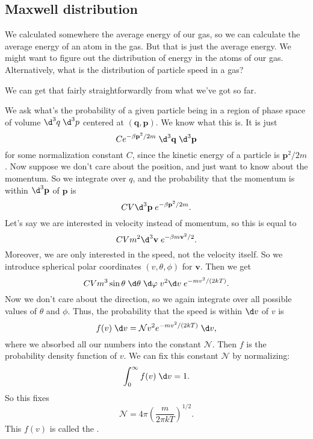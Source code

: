 \documentclass[a4paper]{article}
\begin{document}
\subsection{Maxwell distribution}
We calculated somewhere the average energy of our gas, so we can calculate the average energy of an atom in the gas. But that is just the average energy. We might want to figure out the distribution of energy in the atoms of our gas. Alternatively, what is the distribution of particle speed in a gas?

We can get that fairly straightforwardly from what we've got so far.

We ask what's the probability of a given particle being in a region of phase space of volume $\d^3 q \;\d^3 p$ centered at $(\mathbf{q}, \mathbf{p})$. We know what this is. It is just
\[
  C e^{-\beta \mathbf{p}^2/2m}\;\d^3 \mathbf{q}\;\d^3 \mathbf{p}
\]
for some normalization constant $C$, since the kinetic energy of a particle is $\mathbf{p}^2/2m$. Now suppose we don't care about the position, and just want to know about the momentum. So we integrate over $q$, and the probability that the momentum is within $\d^3 \mathbf{p}$ of $\mathbf{p}$ is
\[
  CV \d^3 \mathbf{p}\; e^{-\beta \mathbf{p}^2/2m}.
\]
Let's say we are interested in velocity instead of momentum, so this is equal to
\[
  CV m^2 \d^3 \mathbf{v}\; e^{-\beta m\mathbf{v}^2/2}.
\]
Moreover, we are only interested in the speed, not the velocity itself. So we introduce spherical polar coordinates $(v, \theta, \phi)$ for $\mathbf{v}$. Then we get
\[
  CV m^3 \sin \theta\; \d \theta\;\d \varphi\;v^2 \d v\;e^{-mv^2/(2kT)}.
\]
Now we don't care about the direction, so we again integrate over all possible values of $\theta$ and $\phi$. Thus, the probability that the speed is within $\d v$ of $v$ is
\[
  f(v)\;\d v = \mathcal{N} v^2 e^{-mv^2/(2kT)} \;\d v,
\]
where we absorbed all our numbers into the constant $\mathcal{N}$. Then $f$ is the probability density function of $v$. We can fix this constant $\mathcal{N}$ by normalizing:
\[
  \int_0^\infty f(v) \;\d v = 1.
\]
So this fixes
\[
  \mathcal{N} = 4\pi \left(\frac{m}{2\pi kT}\right)^{1/2}.
\]
This $f(v)$ is called the .
\end{document}
